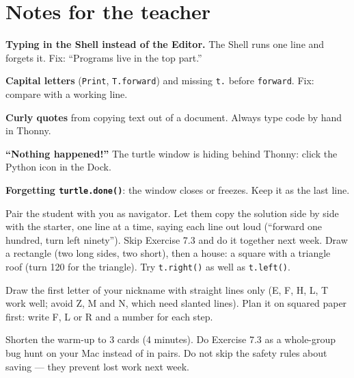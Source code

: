 \section{Notes for the teacher}
\begin{commonmistakes}
  \item \textbf{Typing in the Shell instead of the Editor.} The Shell runs one line and forgets it. Fix: \enquote{Programs live in the top part.}
  \item \textbf{Capital letters} (\texttt{Print}, \texttt{T.forward}) and missing \texttt{t.} before \texttt{forward}. Fix: compare with a working line.
  \item \textbf{Curly quotes} from copying text out of a document. Always type code by hand in Thonny.
  \item \textbf{\enquote{Nothing happened!}} The turtle window is hiding behind Thonny: click the Python icon in the Dock.
  \item \textbf{Forgetting \texttt{turtle.done()}}: the window closes or freezes. Keep it as the last line.
\end{commonmistakes}
\begin{differentiation}
\supportpath Pair the student with you as navigator. Let them copy the solution side by side with the starter, one line at a time, saying each line out loud (\enquote{forward one hundred, turn left ninety}). Skip Exercise 7.3 and do it together next week.
\extensionpath Draw a rectangle (two long sides, two short), then a house: a square with a triangle roof (turn 120 for the triangle). Try \texttt{t.right()} as well as \texttt{t.left()}.
\end{differentiation}
\begin{stretchchallenge}
Draw the first letter of your nickname with straight lines only (E, F, H, L, T work well; avoid Z, M and N, which need slanted lines). Plan it on squared paper first: write F, L or R and a number for each step.
\end{stretchchallenge}
\begin{teachernote}
Shorten the warm-up to 3 cards (4 minutes). Do Exercise 7.3 as a whole-group bug hunt on your Mac instead of in pairs. Do not skip the safety rules about saving --- they prevent lost work next week.
\end{teachernote}
